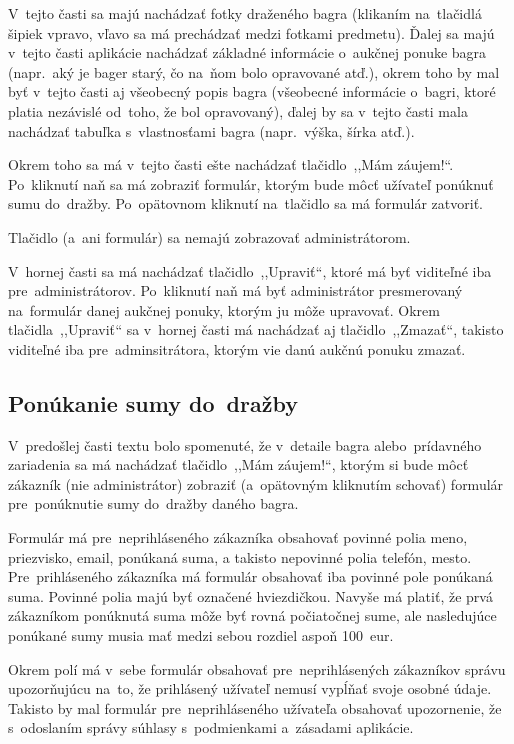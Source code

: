 V~tejto časti sa majú nachádzať fotky draženého bagra (klikaním na~tlačidlá šipiek vpravo, vľavo sa má prechádzať medzi fotkami predmetu). Ďalej sa majú v~tejto časti aplikácie nachádzať základné informácie o~aukčnej ponuke bagra (napr.~aký je bager starý, čo na~ňom bolo opravované atď.), okrem toho by mal byť v~tejto časti aj všeobecný popis bagra (všeobecné informácie o~bagri, ktoré platia nezávislé od~toho, že bol opravovaný), ďalej by sa v~tejto časti mala nachádzať tabuľka s~vlastnosťami bagra (napr.~výška, šírka atď.).

Okrem toho sa má v~tejto časti ešte nachádzať tlačidlo~,,Mám záujem!``. Po~kliknutí naň sa má zobraziť formulár, ktorým bude môcť užívateľ ponúknuť sumu do~dražby. Po~opätovnom kliknutí na~tlačidlo sa má formulár zatvoriť. 

Tlačidlo (a~ani formulár) sa nemajú zobrazovať administrátorom.

V~hornej časti sa má nachádzať tlačidlo~,,Upraviť``, ktoré má byť viditeľné iba pre~administrátorov. Po~kliknutí naň má byť administrátor presmerovaný na~formulár danej aukčnej ponuky, ktorým ju môže upravovať. Okrem tlačidla~,,Upraviť`` sa v~hornej časti má nachádzať aj tlačidlo~,,Zmazať``, takisto viditeľné iba pre~adminsitrátora, ktorým vie danú aukčnú ponuku zmazať.

\subsection{Ponúkanie sumy do~dražby}
\label{ponukanie sumy do drazby}

V~predošlej časti textu bolo spomenuté, že v~detaile bagra alebo~prídavného zariadenia sa má nachádzať tlačidlo~,,Mám záujem!``, ktorým si bude môcť zákazník (nie administrátor) zobraziť (a~opätovným kliknutím schovať) formulár pre~ponúknutie sumy do~dražby daného bagra.

Formulár má pre~neprihláseného zákazníka obsahovať povinné polia meno, priezvisko, email, ponúkaná suma, a takisto nepovinné polia telefón, mesto. Pre~prihláseného zákazníka má formulár obsahovať iba povinné pole ponúkaná suma. Povinné polia majú byť označené hviezdičkou. Navyše má platiť, že prvá zákazníkom ponúknutá suma môže byť rovná počiatočnej sume, ale nasledujúce ponúkané sumy musia mať medzi sebou rozdiel aspoň 100~eur.

Okrem polí má v~sebe formulár obsahovať pre~neprihlásených zákazníkov správu upozorňujúcu na~to, že prihlásený užívateľ nemusí vypĺňať svoje osobné údaje. Takisto by mal formulár pre~neprihláseného užívateľa obsahovať upozornenie, že s~odoslaním správy súhlasy s~podmienkami a~zásadami aplikácie.

